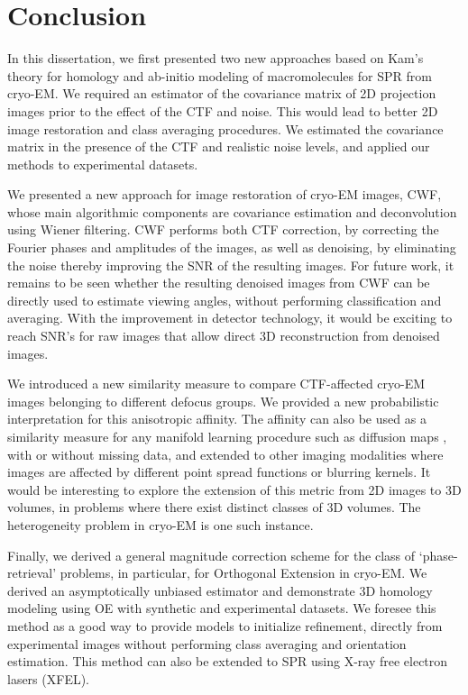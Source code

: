 \chapter{Conclusion}
In this dissertation, we first presented two new approaches based on Kam's theory for homology and ab-initio modeling of macromolecules for SPR from cryo-EM. We required an estimator of the covariance matrix of 2D projection images prior to the effect of the CTF and noise. This would lead to better 2D image restoration and class averaging procedures. We estimated the covariance matrix in the presence of the CTF and realistic noise levels, and applied our methods to experimental datasets.

We presented a new approach for image restoration of cryo-EM images, CWF, whose
main algorithmic components are covariance estimation and deconvolution using Wiener filtering.
CWF performs both CTF correction, by correcting the Fourier phases and amplitudes of the images, 
as well as denoising, by eliminating the noise thereby improving the SNR of the resulting images.
For future work, it remains to be seen whether the resulting denoised images from CWF can be directly used to estimate viewing angles,
without performing classification and averaging. With the improvement in detector technology, it would be exciting to reach SNR's for raw images that allow direct 3D reconstruction from denoised images. 

We introduced a new similarity measure to compare CTF-affected cryo-EM images belonging to different defocus groups. We provided a new probabilistic interpretation for this anisotropic affinity. The affinity can also be used as a similarity measure for any manifold learning procedure \cite{intgeom, nlica} such as diffusion maps \cite{vdm, difmap}, with or without missing data, and extended to other imaging modalities where images are affected by different point spread functions or blurring kernels. It would be interesting to explore the extension of this metric from 2D images to 3D volumes, in problems where there exist distinct classes of 3D volumes. The heterogeneity problem in cryo-EM is one such instance.

Finally, we derived a general magnitude correction scheme for the class of
`phase-retrieval' problems, in particular, for Orthogonal Extension in cryo-EM.
We derived an asymptotically unbiased estimator and demonstrate 3D homology modeling using OE with synthetic and experimental datasets. We foresee this method as a good way to provide models to initialize refinement, directly from experimental images without performing class averaging and orientation estimation. This method can also be extended to SPR using X-ray free electron lasers (XFEL). 

